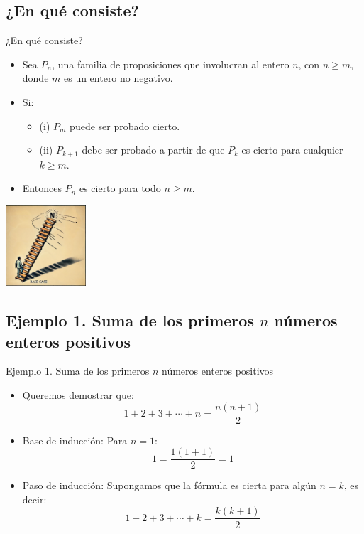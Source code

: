 \documentclass{beamer}
\begin{document}
\subsection{¿En qué consiste?}
\begin{frame}{¿En qué consiste?}
    \begin{itemize}
        \item Sea \( P_n \), una familia de proposiciones que involucran al entero \( n \), con \( n \geq m \), donde \( m \) es un entero no negativo.
        \item Si:
        \begin{itemize}
            \item (i) \( P_m \) puede ser probado cierto.
            \item (ii) \( P_{k+1} \) debe ser probado a partir de que \( P_k \) es cierto para cualquier \( k \geq m \).
        \end{itemize}
        \item Entonces \( P_n \) es cierto para todo \( n \geq m \).
    \end{itemize}
    \begin{center}
    \includegraphics[width=3cm]{images/ladder.png}
    \end{center}
\end{frame}

\subsection{Ejemplo 1. Suma de los primeros \( n \) números enteros positivos}
\begin{frame}{Ejemplo 1. Suma de los primeros \( n \) números enteros positivos}
    \begin{itemize}
        \item Queremos demostrar que: \[ 1 + 2 + 3 + \cdots + n = \frac{n(n+1)}{2} \]
        \item Base de inducción: Para \( n = 1 \):
        \[ 1 = \frac{1(1+1)}{2} = 1 \]
        \item Paso de inducción: Supongamos que la fórmula es cierta para algún \( n = k \), es decir:
        \[ 1 + 2 + 3 + \cdots + k = \frac{k(k+1)}{2} \]
    \end{itemize}
\end{frame}
\end{document}
